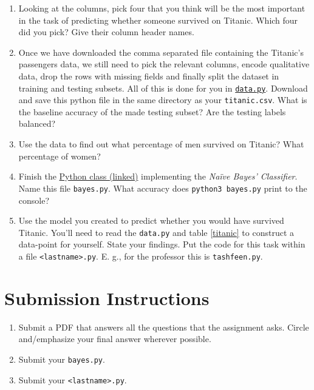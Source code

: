 \documentclass{homework}
\begin{document}
\begin{enumerate}
  \item Looking at the columns, pick four that you think will be the
        most important in the task of predicting whether someone survived on
        Titanic. Which four did you pick? Give their column header names.

  \item Once we have downloaded the comma separated file containing
        the Titanic's passengers data, we still need to pick the relevant
        columns, encode qualitative data, drop the rows with missing fields
        and finally split the dataset in training and testing subsets. All
        of this is done for you in
        \href{https://tashfeen.org/raw/share/ml/data.py}{\texttt{data.py}}.
        Download and save this python file in the same directory as your
        \texttt{titanic.csv}. What is the baseline accuracy of the made
        testing subset? Are the testing labels balanced?

  \item Use the data to find out what percentage of men survived on
        Titanic? What percentage of women?

  \item Finish the
        \href{https://tashfeen.org/raw/share/ml/stub.py}{Python class
          (linked)} implementing the \textit{Na\"ive Bayes'
          Classifier}. Name this file \texttt{bayes.py}. What accuracy does
        \texttt{python3 bayes.py} print to the console?

  \item Use the model you created to predict whether you would have
        survived Titanic. You'll need to read the \texttt{data.py} and table
        \ref{titanic} to construct a data-point for yourself. State your
        findings. Put the code for this task within a file
        \texttt{<lastname>.py}. E. g., for the professor this is
        \texttt{tashfeen.py}.

\end{enumerate}

\section*{Submission Instructions}
\begin{enumerate}
  \item Submit a PDF that answers all the questions that the
        assignment asks. Circle and/emphasize your final answer wherever
        possible.
  \item Submit your \texttt{bayes.py}.
  \item Submit your \texttt{<lastname>.py}.
\end{enumerate}
\end{document}
